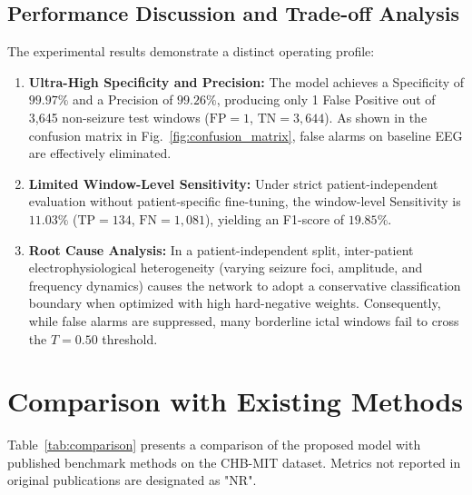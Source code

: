 \documentclass[conference]{IEEEtran}
\begin{document}
\subsection{Performance Discussion and Trade-off Analysis}
The experimental results demonstrate a distinct operating profile:
\begin{enumerate}
    \item \textbf{Ultra-High Specificity and Precision:} The model achieves a Specificity of $99.97\%$ and a Precision of $99.26\%$, producing only 1 False Positive out of 3,645 non-seizure test windows ($\text{FP}=1$, $\text{TN}=3,644$). As shown in the confusion matrix in Fig.~\ref{fig:confusion_matrix}, false alarms on baseline EEG are effectively eliminated.
    \item \textbf{Limited Window-Level Sensitivity:} Under strict patient-independent evaluation without patient-specific fine-tuning, the window-level Sensitivity is $11.03\%$ ($\text{TP}=134$, $\text{FN}=1,081$), yielding an F1-score of $19.85\%$.
    \item \textbf{Root Cause Analysis:} In a patient-independent split, inter-patient electrophysiological heterogeneity (varying seizure foci, amplitude, and frequency dynamics) causes the network to adopt a conservative classification boundary when optimized with high hard-negative weights. Consequently, while false alarms are suppressed, many borderline ictal windows fail to cross the $T=0.50$ threshold.
\end{enumerate}

\section{Comparison with Existing Methods}
Table~\ref{tab:comparison} presents a comparison of the proposed model with published benchmark methods on the CHB-MIT dataset. Metrics not reported in original publications are designated as "NR".
\end{document}
